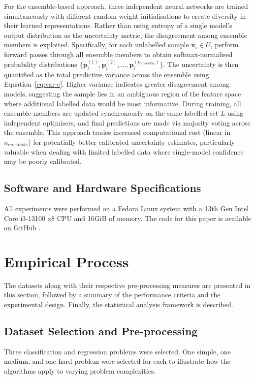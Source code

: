 \documentclass[10pt, conference]{IEEEtran}
\begin{document}
For the ensemble-based approach, three independent neural networks are trained simultaneously with different random weight initialisations to create diversity in their learned representations. Rather than using entropy of a single model's output distribution as the uncertainty metric, the disagreement among ensemble members is exploited. Specifically, for each unlabelled sample $\mathbf{x}_i \in U$, perform forward passes through all ensemble members to obtain softmax-normalised probability distributions $\{\mathbf{p}^{(1)}_i, \mathbf{p}^{(2)}_i, ..., \mathbf{p}^{(n_{ensemble})}_i\}$. The uncertainty is then quantified as the total predictive variance across the ensemble using Equation~\ref{eq:var-e}. Higher variance indicates greater disagreement among models, suggesting the sample lies in an ambiguous region of the feature space where additional labelled data would be most informative. During training, all ensemble members are updated synchronously on the same labelled set $L$ using independent optimisers, and final predictions are made via majority voting across the ensemble. This approach trades increased computational cost (linear in $n_{ensemble}$) for potentially better-calibrated uncertainty estimates, particularly valuable when dealing with limited labelled data where single-model confidence may be poorly calibrated.

\subsection{Software and Hardware Specifications}
All experiments were performed on a Fedora Linux system with a 13th Gen Intel Core i3-13100 x8 CPU and 16GiB of memory. The code for this paper is available on GitHub \cite{github}.



\section{Empirical Process}
The datasets along with their respective pre-processing measures are presented in this section, followed by a summary of the performance criteria and the experimental design. Finally, the statistical analysis framework is described.
\subsection{Dataset Selection and Pre-processing}
Three classification and regression problems were selected. One simple, one medium, and one hard problem were selected for each to illustrate how the algorithms apply to varying problem complexities. 
\end{document}
